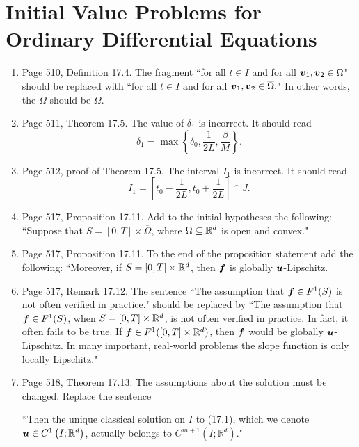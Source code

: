 \documentclass{book}
\begin{document}
\chapter{Initial Value Problems for Ordinary Differential Equations}

	\begin{enumerate}
	\item
Page 510, Definition 17.4. The fragment ``for all $t\in I$ and for all $\boldsymbol{v}_1, \boldsymbol{v}_2\in \Omega$" should be replaced with  ``for all $t\in I$ and for all $\boldsymbol{v}_1, \boldsymbol{v}_2\in \overline{\Omega}.$" In other words, the $\Omega$ should be $\overline{\Omega}$.

	\item
Page 511, Theorem 17.5. The value of $\delta_1$ is incorrect. It should read
	\[
\delta_1 = \max\left\{\delta_0, \frac{1}{2L} , \frac{\beta}{M} \right\}.
	\]
	
	\item
Page 512, proof of Theorem 17.5. The interval $I_1$ is incorrect. It should read
	\[
I_1 = \left[t_0 - \frac{1}{2L} , t_0 +\frac{1}{2L} \right]\cap J	.
	\]

	\item
Page 517, Proposition 17.11. Add to the initial hypotheses the following: ``Suppose that $S = [0,T]\times \overline\Omega$, where $\Omega \subseteq\mathbb R^d$ is open and convex."

	\item
Page 517, Proposition 17.11. To the end of the proposition statement add the following: ``Moreover, if $S = [0,T]\times \mathbb R^d$, then $\boldsymbol{f}$ is globally $\boldsymbol{u}$-Lipschitz.

	\item
Page 517, Remark 17.12. The sentence ``The assumption that $\boldsymbol{f}\in F^1(S)$ is not often verified in practice." should be replaced by ``The assumption that $\boldsymbol{f}\in F^1(S)$, when $S = [0,T] \times \mathbb R^d$, is not often verified in practice. In fact, it often fails to be true. If $\boldsymbol{f}\in F^1([0,T]\times \mathbb R^d)$, then $\boldsymbol{f}$ would be globally $\boldsymbol{u}$-Lipschitz. In many important, real-world problems the slope function is only locally Lipschitz." 

	\item
Page 518, Theorem 17.13. The assumptions about the solution must be changed. Replace the sentence 

	\medskip

\hspace{0.5in}``Then the unique classical solution on $I$ to (17.1), which we denote $\boldsymbol{u}\in C^1\left(I;\mathbb{R}^d\right)$, actually belongs to $C^{m+1}\left(I;\mathbb{R}^d\right)$."


\end{enumerate}
\end{document}
